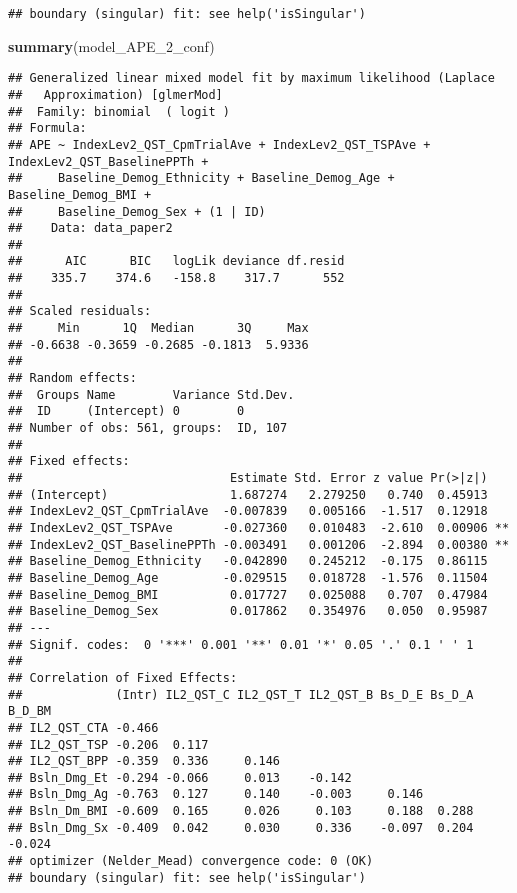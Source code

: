 \documentclass[
  12pt,
]{article}
\newenvironment{Shaded}{\begin{snugshade}}{\end{snugshade}}
\newcommand{\FunctionTok}[1]{\textcolor[rgb]{0.13,0.29,0.53}{\textbf{#1}}}
\newcommand{\NormalTok}[1]{#1}
\begin{document}
\begin{verbatim}
## boundary (singular) fit: see help('isSingular')
\end{verbatim}

\begin{Shaded}
\begin{Highlighting}[]
\FunctionTok{summary}\NormalTok{(model\_APE\_2\_conf)}
\end{Highlighting}
\end{Shaded}

\begin{verbatim}
## Generalized linear mixed model fit by maximum likelihood (Laplace
##   Approximation) [glmerMod]
##  Family: binomial  ( logit )
## Formula: 
## APE ~ IndexLev2_QST_CpmTrialAve + IndexLev2_QST_TSPAve + IndexLev2_QST_BaselinePPTh +  
##     Baseline_Demog_Ethnicity + Baseline_Demog_Age + Baseline_Demog_BMI +  
##     Baseline_Demog_Sex + (1 | ID)
##    Data: data_paper2
## 
##      AIC      BIC   logLik deviance df.resid 
##    335.7    374.6   -158.8    317.7      552 
## 
## Scaled residuals: 
##     Min      1Q  Median      3Q     Max 
## -0.6638 -0.3659 -0.2685 -0.1813  5.9336 
## 
## Random effects:
##  Groups Name        Variance Std.Dev.
##  ID     (Intercept) 0        0       
## Number of obs: 561, groups:  ID, 107
## 
## Fixed effects:
##                             Estimate Std. Error z value Pr(>|z|)   
## (Intercept)                 1.687274   2.279250   0.740  0.45913   
## IndexLev2_QST_CpmTrialAve  -0.007839   0.005166  -1.517  0.12918   
## IndexLev2_QST_TSPAve       -0.027360   0.010483  -2.610  0.00906 **
## IndexLev2_QST_BaselinePPTh -0.003491   0.001206  -2.894  0.00380 **
## Baseline_Demog_Ethnicity   -0.042890   0.245212  -0.175  0.86115   
## Baseline_Demog_Age         -0.029515   0.018728  -1.576  0.11504   
## Baseline_Demog_BMI          0.017727   0.025088   0.707  0.47984   
## Baseline_Demog_Sex          0.017862   0.354976   0.050  0.95987   
## ---
## Signif. codes:  0 '***' 0.001 '**' 0.01 '*' 0.05 '.' 0.1 ' ' 1
## 
## Correlation of Fixed Effects:
##             (Intr) IL2_QST_C IL2_QST_T IL2_QST_B Bs_D_E Bs_D_A B_D_BM
## IL2_QST_CTA -0.466                                                   
## IL2_QST_TSP -0.206  0.117                                            
## IL2_QST_BPP -0.359  0.336     0.146                                  
## Bsln_Dmg_Et -0.294 -0.066     0.013    -0.142                        
## Bsln_Dmg_Ag -0.763  0.127     0.140    -0.003     0.146              
## Bsln_Dm_BMI -0.609  0.165     0.026     0.103     0.188  0.288       
## Bsln_Dmg_Sx -0.409  0.042     0.030     0.336    -0.097  0.204 -0.024
## optimizer (Nelder_Mead) convergence code: 0 (OK)
## boundary (singular) fit: see help('isSingular')
\end{verbatim}
\end{document}
